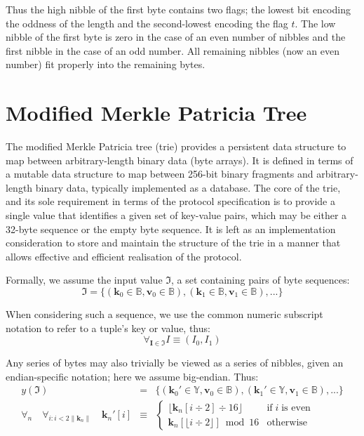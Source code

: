 \documentclass[9pt,oneside]{amsart}
\begin{document}
Thus the high nibble of the first byte contains two flags; the lowest bit encoding the oddness of the length and the second-lowest encoding the flag $t$. The low nibble of the first byte is zero in the case of an even number of nibbles and the first nibble in the case of an odd number. All remaining nibbles (now an even number) fit properly into the remaining bytes.

\section{Modified Merkle Patricia Tree}\label{app:trie}\hypertarget{trie}{}
The modified Merkle Patricia tree (trie) provides a persistent data structure to map between arbitrary-length binary data (byte arrays). It is defined in terms of a mutable data structure to map between 256-bit binary fragments and arbitrary-length binary data, typically implemented as a database. The core of the trie, and its sole requirement in terms of the protocol specification is to provide a single value that identifies a given set of key-value pairs, which may be either a 32-byte sequence or the empty byte sequence. It is left as an implementation consideration to store and maintain the structure of the trie in a manner that allows effective and efficient realisation of the protocol.

Formally, we assume the input value $\mathfrak{I}$, a set containing pairs of byte sequences:
\begin{equation}
\mathfrak{I} = \{ (\mathbf{k}_0 \in \mathbb{B}, \mathbf{v}_0 \in \mathbb{B}), (\mathbf{k}_1 \in \mathbb{B}, \mathbf{v}_1 \in \mathbb{B}), ... \}
\end{equation}

When considering such a sequence, we use the common numeric subscript notation to refer to a tuple's key or value, thus:
\begin{equation}
\forall_{\mathbf{I} \in \mathfrak{I}} I \equiv (I_0, I_1)
\end{equation}

Any series of bytes may also trivially be viewed as a series of nibbles, given an endian-specific notation; here we assume big-endian. Thus:
\begin{eqnarray}
y(\mathfrak{I}) & = & \{ (\mathbf{k}_0' \in \mathbb{Y}, \mathbf{v}_0 \in \mathbb{B}), (\mathbf{k}_1' \in \mathbb{Y}, \mathbf{v}_1 \in \mathbb{B}), ... \} \\
\forall_{n} \quad \forall_{i: i < 2\lVert\mathbf{k}_{n}\rVert} \quad \mathbf{k}_{n}'[i] & \equiv &
\begin{cases}
\lfloor \mathbf{k}_{n}[i \div 2] \div 16 \rfloor & \text{if} \; i \; \text{is even} \\
\mathbf{k}_{n}[\lfloor i \div 2 \rfloor] \bmod 16 & \text{otherwise}
\end{cases}
\end{eqnarray}
\end{document}
